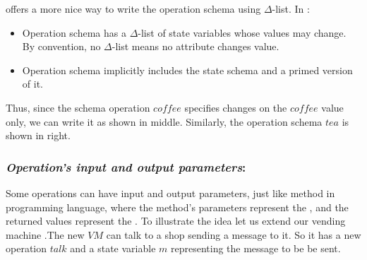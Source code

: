 \begin{itemize}


\oz{} offers a more nice way to write the operation schema using $\Delta$-list. In \oz{}:
\begin{itemize}
\item Operation schema has a $\Delta$-list of state variables
whose values may change. By convention, no $\Delta$-list means
no attribute changes value.
\item Operation schema implicitly
includes the state schema and a primed version of it.
\end{itemize}
Thus, since the schema operation $coffee$ specifies changes on the $coffee$ value only, we can write it as shown in  middle. 
Similarly, the operation schema $tea$ is shown in  right.
\end{itemize}

\subsubsection{\textit{Operation's input and output parameters}:} 
\label{operation_input_output_parameters} 
Some operations can have input and output parameters, just like method in programming language, where the method's parameters represent the , and the returned values represent the . To illustrate the idea let us extend our vending machine .The new $VM$ can talk to a shop sending a message to it. So it has a new operation $talk$ and a state variable $m$ representing the message to be be sent.


